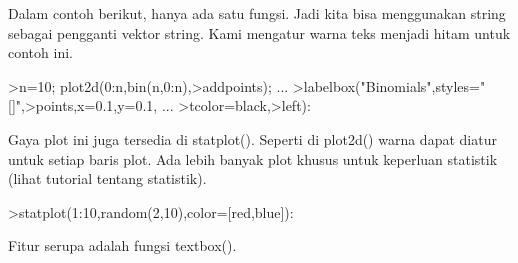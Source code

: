 \documentclass{article}
\begin{document}
\begin{eulernotebook}
\begin{eulercomment}
\begin{eulercomment}
\begin{eulercomment}
\begin{eulercomment}
\begin{eulercomment}
\begin{eulercomment}
\begin{eulercomment}
\begin{eulercomment}
\begin{eulercomment}
\begin{eulercomment}
\begin{eulercomment}
\begin{eulercomment}
\begin{eulercomment}
Dalam contoh berikut, hanya ada satu fungsi. Jadi kita bisa
menggunakan string sebagai pengganti vektor string. Kami mengatur
warna teks menjadi hitam untuk contoh ini.
\end{eulercomment}
\begin{eulerprompt}
>n=10; plot2d(0:n,bin(n,0:n),>addpoints); ...
>labelbox("Binomials",styles="[]",>points,x=0.1,y=0.1, ...
>tcolor=black,>left):
\end{eulerprompt}
\begin{eulercomment}
Gaya plot ini juga tersedia di statplot(). Seperti di plot2d() warna
dapat diatur untuk setiap baris plot. Ada lebih banyak plot khusus
untuk keperluan statistik (lihat tutorial tentang statistik).
\end{eulercomment}
\begin{eulerprompt}
>statplot(1:10,random(2,10),color=[red,blue]):
\end{eulerprompt}
\begin{eulercomment}
Fitur serupa adalah fungsi textbox().


\end{eulercomment}
\end{eulercomment}
\end{eulercomment}
\end{eulercomment}
\end{eulercomment}
\end{eulercomment}
\end{eulercomment}
\end{eulercomment}
\end{eulercomment}
\end{eulercomment}
\end{eulercomment}
\end{eulercomment}
\end{eulercomment}
\end{eulernotebook}
\end{document}
